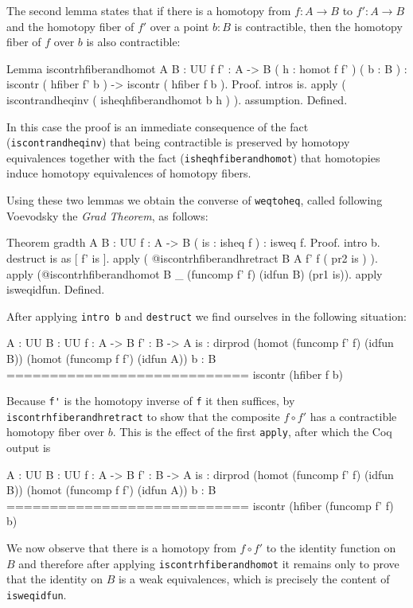 The second lemma states that if there is a homotopy from $f:A\to B$ to
$f':A\to B$
and the homotopy fiber of $f'$ over a point $b : B$ is contractible,
then the homotopy fiber of $f$ over $b$ is also contractible:
\begin{center}
  \begin{coqcode}
Lemma iscontrhfiberandhomot { A B : UU } { f f' : A -> B } ( h : homot
f f' ) ( b : B ) : iscontr ( hfiber f' b ) -> iscontr ( hfiber f b ).
Proof.
  intros is. apply ( iscontrandheqinv ( isheqhfiberandhomot b h ) ). 
  assumption.
Defined.
  \end{coqcode}
\end{center}
In this case the proof is an immediate consequence of the fact 
(\verb|iscontrandheqinv|) that being contractible is preserved by
homotopy equivalences together with the fact
(\verb|isheqhfiberandhomot|) that homotopies induce homotopy
equivalences of homotopy fibers.

Using these two lemmas we obtain the converse of \verb|weqtoheq|,
called following Voevodsky the \emph{Grad Theorem}, as follows:
\begin{center}
\begin{coqcode}
Theorem gradth { A B : UU } { f : A -> B } ( is : isheq f ) : isweq f.
Proof.
  intro b. destruct is as [ f' is ]. 
  apply ( @iscontrhfiberandhretract B A f' f ( pr2 is ) ). 
  apply (@iscontrhfiberandhomot B _ (funcomp f' f) (idfun B) (pr1 is)). 
  apply isweqidfun.
Defined.
\end{coqcode}
\end{center}
After applying \verb|intro b| and \verb|destruct| we find
ourselves in the following situation:
\begin{center}
  \begin{coqcode}
  A : UU
  B : UU
  f : A -> B
  f' : B -> A
  is : dirprod (homot (funcomp f' f) (idfun B))
         (homot (funcomp f f') (idfun A))
  b : B
  ============================
   iscontr (hfiber f b)
  \end{coqcode}
\end{center}
Because \verb|f'| is the homotopy inverse of \verb|f| it
then suffices, by \verb|iscontrhfiberandhretract| to show that
the composite $f\circ f'$ has a contractible homotopy fiber over $b$.
This is the effect of the first \verb|apply|, after which the Coq
output is
\begin{center}
  \begin{coqcode}
  A : UU
  B : UU
  f : A -> B
  f' : B -> A
  is : dirprod (homot (funcomp f' f) (idfun B))
         (homot (funcomp f f') (idfun A))
  b : B
  ============================
   iscontr (hfiber (funcomp f' f) b)
  \end{coqcode}
\end{center}
We now observe that there is a homotopy from $f\circ f'$ to the
identity function on $B$ and therefore after applying
\verb|iscontrhfiberandhomot| it remains only to prove that the
identity on $B$ is a weak equivalences, which is precisely the content
of \verb|isweqidfun|. 
